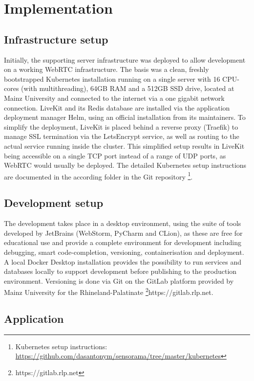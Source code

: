 \chapter{Implementation}

\section{Infrastructure setup}

Initially, the supporting server infrastructure was deployed to allow development on a working WebRTC infrastructure. The basis was a clean, freshly bootstrapped Kubernetes installation running on a single server with 16 CPU-cores (with multithreading), 64GB RAM and a 512GB SSD drive, located at Mainz University and connected to the internet via a one gigabit network connection. LiveKit and its Redis database are installed via the application deployment manager Helm, using an official installation from its maintainers. To simplify the deployment, LiveKit is placed behind a reverse proxy (Traefik) to manage SSL termination via the LetsEncrypt service, as well as routing to the actual service running inside the cluster. This simplified setup results in LiveKit being accessible on a single TCP port instead of a range of UDP ports, as WebRTC would usually be deployed. The detailed Kubernetes setup instructions are documented in the according folder in the Git repository \footnote{Kubernetes setup instructions: \href{https://github.com/dasantonym/sensorama/tree/master/kubernetes}{https://github.com/dasantonym/sensorama/tree/master/kubernetes}}.

\section{Development setup}

The development takes place in a desktop environment, using the suite of tools developed by JetBrains (WebStorm, PyCharm and CLion), as these are free for educational use and provide a complete environment for development including debugging, smart code-completion, versioning, containerisation and deployment. A local Docker Desktop installation provides the possibility to run services and databases locally to support development before publishing to the production environment. Versioning is done via Git on the GitLab platform provided by Mainz University for the Rhineland-Palatinate \footnote{https://gitlab.rlp.net}{https://gitlab.rlp.net}.

\section{Application}

